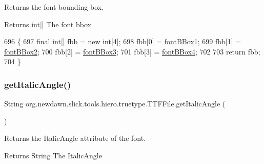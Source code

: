 Returns the font bounding box. \begin{DoxyReturn}{Returns}
int\mbox{[}\mbox{]} The font bbox 
\end{DoxyReturn}

\begin{DoxyCode}
696                                \{
697         \textcolor{keyword}{final} \textcolor{keywordtype}{int}[] fbb = \textcolor{keyword}{new} \textcolor{keywordtype}{int}[4];
698         fbb[0] = \mbox{\hyperlink{classorg_1_1newdawn_1_1slick_1_1tools_1_1hiero_1_1truetype_1_1_t_t_f_file_a436aea819408dbe45dccf805227a2776}{fontBBox1}};
699         fbb[1] = \mbox{\hyperlink{classorg_1_1newdawn_1_1slick_1_1tools_1_1hiero_1_1truetype_1_1_t_t_f_file_ad7c0ad8ab5a7479d8a8836c69c987230}{fontBBox2}};
700         fbb[2] = \mbox{\hyperlink{classorg_1_1newdawn_1_1slick_1_1tools_1_1hiero_1_1truetype_1_1_t_t_f_file_a5f3c9ae4858a3695ae6fe49f0469d1bc}{fontBBox3}};
701         fbb[3] = \mbox{\hyperlink{classorg_1_1newdawn_1_1slick_1_1tools_1_1hiero_1_1truetype_1_1_t_t_f_file_a3f19b12cc0cddb0141fdbb3d36d2a90a}{fontBBox4}};
702 
703         \textcolor{keywordflow}{return} fbb;
704     \}
\end{DoxyCode}
\mbox{\label{classorg_1_1newdawn_1_1slick_1_1tools_1_1hiero_1_1truetype_1_1_t_t_f_file_a6333da01aea233ccaf4b512e4a4ab23f}} 
\subsubsection{\texorpdfstring{get\+Italic\+Angle()}{getItalicAngle()}}
{\footnotesize\ttfamily String org.\+newdawn.\+slick.\+tools.\+hiero.\+truetype.\+T\+T\+F\+File.\+get\+Italic\+Angle (\begin{DoxyParamCaption}{ }\end{DoxyParamCaption})\hspace{0.3cm}{\ttfamily [inline]}}

Returns the Italic\+Angle attribute of the font. \begin{DoxyReturn}{Returns}
String The Italic\+Angle 
\end{DoxyReturn}

